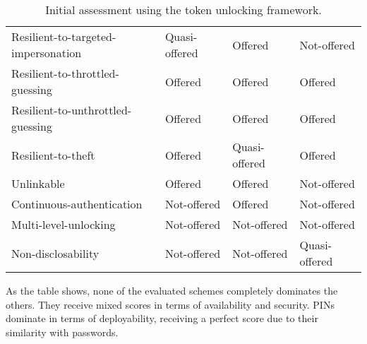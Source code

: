 \begin{table}[h]
\begin{tabular}{l|l|l|l}
    Resilient-to-targeted-impersonation & \cellcolor{yellow!25}Quasi-offered & \cellcolor{green!25}Offered       & \cellcolor{red!25}Not-offered      \\
    Resilient-to-throttled-guessing     & \cellcolor{green!25}Offered       & \cellcolor{green!25}Offered       & \cellcolor{green!25}Offered          \\
    Resilient-to-unthrottled-guessing   & \cellcolor{green!25}Offered       & \cellcolor{green!25}Offered       & \cellcolor{green!25}Offered          \\
    Resilient-to-theft                  & \cellcolor{green!25}Offered       & \cellcolor{yellow!25}Quasi-offered   & \cellcolor{green!25}Offered          \\
    Unlinkable                          & \cellcolor{green!25}Offered       & \cellcolor{green!25}Offered       & \cellcolor{red!25}Not-offered      \\
    Continuous-authentication           & \cellcolor{red!25}Not-offered   & \cellcolor{green!25}Offered       & \cellcolor{red!25}Not-offered      \\
    Multi-level-unlocking               & \cellcolor{red!25}Not-offered   & \cellcolor{red!25}Not-offered   & \cellcolor{red!25}Not-offered      \\
    Non-disclosability                  & \cellcolor{red!25}Not-offered   & \cellcolor{red!25}Not-offered   & \cellcolor{yellow!25}Quasi-offered    \\
    \end{tabular}

	\caption{Initial assessment using the token unlocking framework.}
	\label{table:results}

\end{table}

As the table shows, none of the evaluated schemes completely dominates the others. They receive mixed scores in terms of availability and security. PINs dominate in terms of deployability, receiving a perfect score due to their similarity with passwords. 